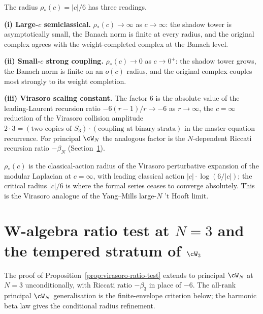 \begin{remark}[Geometric content of $\rho_*(c) = |c|/6$]
\label{rem:rho-star-geometric-meaning}
The radius $\rho_*(c) = |c|/6$ has three readings.

\textbf{(i) Large-$c$ semiclassical.} $\rho_*(c) \to \infty$ as
$c \to \infty$: the shadow tower is asymptotically small, the Banach
norm is finite at every radius, and the original complex agrees with
the weight-completed complex at the Banach level.

\textbf{(ii) Small-$c$ strong coupling.} $\rho_*(c) \to 0$ as
$c \to 0^+$: the shadow tower grows, the Banach norm is finite on an
$o(c)$ radius, and the original complex couples most strongly to its
weight completion.

\textbf{(iii) Virasoro scaling constant.} The factor $6$ is the
absolute value of the leading-Laurent recursion ratio
$-6(r-1)/r \to -6$ as $r \to \infty$, the $c=\infty$ reduction of the
Virasoro collision amplitude
$2 \cdot 3 = (\text{two copies of } S_3) \cdot (\text{coupling at
binary strata})$ in the master-equation recurrence. For principal
$\cW_N$ the analogous factor is the $N$-dependent Riccati recursion
ratio $-\beta_N$ (Section~\ref{sec:wn-ratio-test}).

$\rho_*(c)$ is the classical-action radius of the Virasoro
perturbative expansion of the modular Laplacian at $c = \infty$, with
leading classical action $|c| \cdot \log(6 / |c|)$; the critical radius
$|c| / 6$ is where the formal series ceases to converge absolutely.
This is the Virasoro analogue of the Yang--Mills large-$N$ 't Hooft
limit.
\end{remark}

\section{W-algebra ratio test at $N = 3$ and the tempered stratum of $\cW_3$}
\label{sec:wn-ratio-test}

The proof of Proposition~\ref{prop:virasoro-ratio-test} extends to
principal $\cW_N$ at $N = 3$ unconditionally, with Riccati ratio
$-\beta_3$ in place of $-6$. The all-rank principal $\cW_N$
generalisation is the finite-envelope criterion below; the harmonic
beta law gives the conditional radius refinement.

